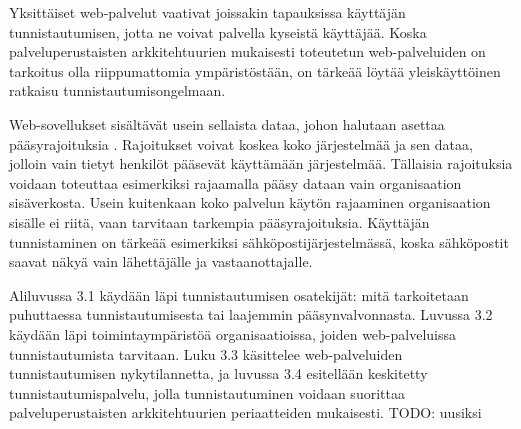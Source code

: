 Yksittäiset web-palvelut vaativat joissakin tapauksissa käyttäjän tunnistautumisen, jotta ne voivat palvella kyseistä käyttäjää. Koska palveluperustaisten arkkitehtuurien mukaisesti toteutetun web-palveluiden on tarkoitus olla riippumattomia ympäristöstään, on tärkeää löytää yleiskäyttöinen ratkaisu tunnistautumisongelmaan.

Web-sovellukset sisältävät usein sellaista dataa, johon halutaan asettaa pääsyrajoituksia \cite{inside_the_identity_management_game}. Rajoitukset voivat koskea koko järjestelmää ja sen dataa, jolloin vain tietyt henkilöt pääsevät käyttämään järjestelmää. Tällaisia rajoituksia voidaan toteuttaa esimerkiksi rajaamalla pääsy dataan vain organisaation sisäverkosta. Usein kuitenkaan koko palvelun käytön rajaaminen organisaation sisälle ei riitä, vaan tarvitaan tarkempia pääsyrajoituksia. Käyttäjän tunnistaminen on tärkeää esimerkiksi sähköpostijärjestelmässä, koska sähköpostit saavat näkyä vain lähettäjälle ja vastaanottajalle.

Aliluvussa 3.1 käydään läpi tunnistautumisen osatekijät: mitä tarkoitetaan puhuttaessa tunnistautumisesta tai laajemmin pääsynvalvonnasta. Luvussa 3.2 käydään läpi toimintaympäristöä organisaatioissa, joiden web-palveluissa tunnistautumista tarvitaan. Luku 3.3 käsittelee web-palveluiden tunnistautumisen nykytilannetta, ja luvussa 3.4 esitellään keskitetty tunnistautumispalvelu, jolla tunnistautuminen voidaan suorittaa palveluperustaisten arkkitehtuurien periaatteiden mukaisesti. TODO: uusiksi